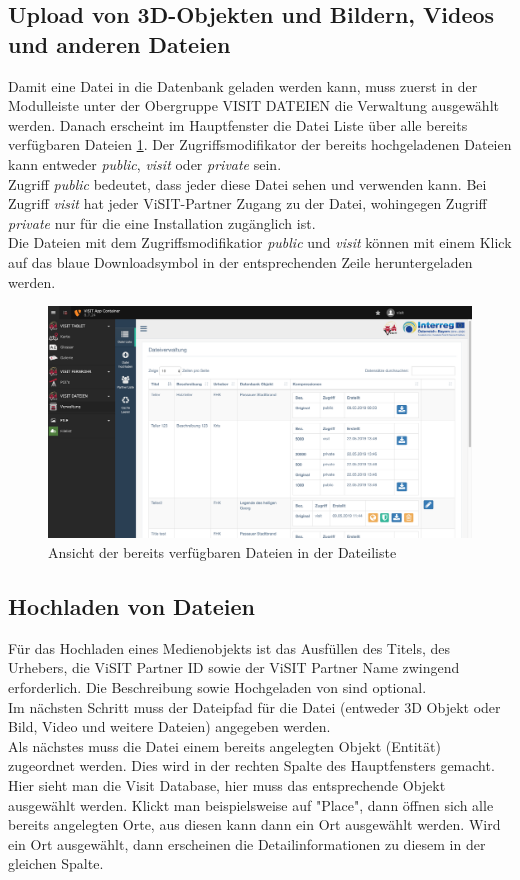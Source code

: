 \subsection{Upload von 3D-Objekten und Bildern, Videos und anderen Dateien}

Damit eine Datei in die Datenbank geladen werden kann, muss zuerst in der Modulleiste unter der Obergruppe VISIT DATEIEN die Verwaltung ausgewählt werden. Danach erscheint im Hauptfenster die Datei Liste über alle bereits verfügbaren Dateien \ref{img:dateiliste}. Der Zugriffsmodifikator der bereits hochgeladenen Dateien kann entweder \textit{public}, \textit{visit} oder \textit{private} sein.\\
Zugriff \textit{public} bedeutet, dass jeder diese Datei sehen und verwenden kann. Bei Zugriff \textit{visit} hat jeder ViSIT-Partner Zugang zu der Datei, wohingegen Zugriff \textit{private} nur für die eine Installation zugänglich ist.\\
Die Dateien mit dem Zugriffsmodifikatior \textit{public} und \textit{visit} können mit einem Klick auf das blaue Downloadsymbol in der entsprechenden Zeile heruntergeladen werden.

\begin{figure}[ht!]
\centering
\includegraphics[width=12cm]{Figures/paula/dateiverwaltung/dateiliste.png}
\caption{Ansicht der bereits verfügbaren Dateien in der Dateiliste}
\label{img:dateiliste}
\end{figure}

\subsection{Hochladen von Dateien}

Für das Hochladen eines Medienobjekts ist das Ausfüllen des Titels, des Urhebers, die ViSIT Partner ID sowie der ViSIT Partner Name zwingend erforderlich. Die Beschreibung sowie Hochgeladen von sind optional.\\
Im nächsten Schritt muss der Dateipfad für die Datei (entweder 3D Objekt oder Bild, Video und weitere Dateien) angegeben werden.\\
Als nächstes muss die Datei einem bereits angelegten Objekt (Entität) zugeordnet werden. Dies wird in der rechten Spalte des Hauptfensters gemacht. Hier sieht man die Visit Database, hier muss das entsprechende Objekt ausgewählt werden. Klickt man beispielsweise auf "Place", dann öffnen sich alle bereits angelegten Orte, aus diesen kann dann ein Ort ausgewählt werden. Wird ein Ort ausgewählt, dann erscheinen die Detailinformationen zu diesem in der gleichen Spalte.\\

